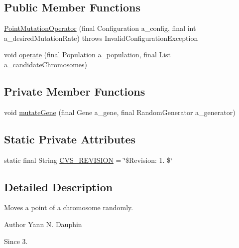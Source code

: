 \subsection*{Public Member Functions}
\begin{DoxyCompactItemize}
\item 
\hyperlink{classexamples_1_1monalisa_1_1core_1_1_point_mutation_operator_ad8e19d3481f7c77474292361b581b851}{Point\-Mutation\-Operator} (final Configuration a\-\_\-config, final int a\-\_\-desired\-Mutation\-Rate)  throws Invalid\-Configuration\-Exception 
\item 
void \hyperlink{classexamples_1_1monalisa_1_1core_1_1_point_mutation_operator_a77dc2c33c39c88ed99f6300dd8022125}{operate} (final Population a\-\_\-population, final List a\-\_\-candidate\-Chromosomes)
\end{DoxyCompactItemize}
\subsection*{Private Member Functions}
\begin{DoxyCompactItemize}
\item 
void \hyperlink{classexamples_1_1monalisa_1_1core_1_1_point_mutation_operator_ae2649f768170f982f78b2bad2540c6f2}{mutate\-Gene} (final Gene a\-\_\-gene, final Random\-Generator a\-\_\-generator)
\end{DoxyCompactItemize}
\subsection*{Static Private Attributes}
\begin{DoxyCompactItemize}
\item 
static final String \hyperlink{classexamples_1_1monalisa_1_1core_1_1_point_mutation_operator_af752ce4312a010c302a6e694ff4b29c0}{C\-V\-S\-\_\-\-R\-E\-V\-I\-S\-I\-O\-N} = \char`\"{}\$Revision\-: 1. \$\char`\"{}
\end{DoxyCompactItemize}


\subsection{Detailed Description}
Moves a point of a chromosome randomly.

\begin{DoxyAuthor}{Author}
Yann N. Dauphin 
\end{DoxyAuthor}
\begin{DoxySince}{Since}
3. 
\end{DoxySince}


